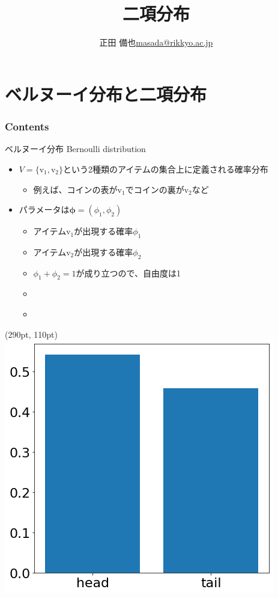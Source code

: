 \documentclass[aspectratio=169,unicode,dvipdfmx,14pt]{beamer}
\title{ \\二項分布}
\author{\texorpdfstring{正田 備也\newline\href{mailto:masada@rikkyo.ac.jp}{masada@rikkyo.ac.jp}}{正田 備也}}
\date{}
\begin{document}
\begin{frame}
\titlepage
\end{frame}

\section{ベルヌーイ分布と二項分布}

\begin{frame}\frametitle{Contents}
\Large \tableofcontents[currentsection]
\end{frame}

\begin{frame}{ベルヌーイ分布 Bernoulli distribution}
\begin{itemize}
\item $V=\{\mbox{v}_1,\mbox{v}_2\}$という2種類のアイテムの集合上に定義される確率分布
\begin{itemize}
\item 例えば、コインの表が$\mbox{v}_1$でコインの裏が$\mbox{v}_2$など
\end{itemize}
\item パラメータは$\bm{\phi} = (\phi_1, \phi_2)$
\begin{itemize}
\item アイテム$\mbox{v}_1$が出現する確率$\phi_1$
\item アイテム$\mbox{v}_2$が出現する確率$\phi_2$
\item $\phi_1 + \phi_2=1$が成り立つので、自由度は1
\item[] \
\item[] \
\end{itemize}
\end{itemize}
\begin{textblock*}{0.4\linewidth}(290pt, 110pt)
    \centering
    \includegraphics[width=0.8\linewidth]{bernoulli_bar}
\end{textblock*}
\end{frame}
\end{document}
